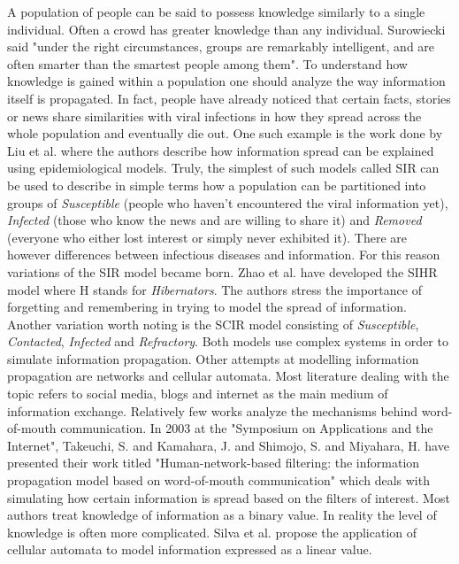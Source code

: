 A population of people can be said to possess knowledge similarly to a single individual.
Often a crowd has greater knowledge than any individual.
Surowiecki said "under the right circumstances, groups are remarkably intelligent, and are often smarter than the smartest people among them"\cite{surowiecki2005wisdom}.
To understand how knowledge is gained within a population one should analyze the way information itself is propagated.
In fact, people have already noticed that certain facts, stories or news share similarities with viral infections in how they spread across the whole population and eventually die out.
One such example is the work done by Liu et al.\cite{liu2016} where the authors describe how information spread can be explained using epidemiological models.
Truly, the simplest of such models called SIR\cite{weiss2013sir} can be used to describe in simple terms how a population can be partitioned into groups of \emph{Susceptible} (people who haven't encountered the viral information yet), \emph{Infected} (those who know the news and are willing to share it) and \emph{Removed} (everyone who either lost interest or simply never exhibited it).
There are however differences between infectious diseases and information.
For this reason variations of the SIR model became born.
Zhao et al.\cite{zhao2012sihr} have developed the SIHR model where H stands for \emph{Hibernators}.
The authors stress the importance of forgetting and remembering in trying to model the spread of information.
Another variation worth noting is the SCIR model consisting of \emph{Susceptible}, \emph{Contacted}, \emph{Infected} and \emph{Refractory}\cite{xiong2012scir}.
Both models use complex systems in order to simulate information propagation.
Other attempts at modelling information propagation are networks\cite{rodriguez2013} and cellular automata\cite{silva2020}.
Most literature dealing with the topic refers to social media, blogs and internet as the main medium of information exchange.
Relatively few works analyze the mechanisms behind word-of-mouth communication.
In 2003 at the "Symposium on Applications and the Internet", Takeuchi, S. and Kamahara, J. and Shimojo, S. and Miyahara, H. have presented their work titled "Human-network-based filtering: the information propagation model based on word-of-mouth communication" which deals with simulating how certain information is spread based on the filters of interest\cite{takeuchi1183031}.
Most authors treat knowledge of information as a binary value.
In reality the level of knowledge is often more complicated.
Silva et al.\cite{silva2020} propose the application of cellular automata to model information expressed as a linear value.
